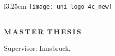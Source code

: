 \frontmatter
\pagestyle{empty}


\begin{titlepage}
\rule{0mm}{1mm}
\vspace*{10mm}
\begin{wrapfigure}{l}{3.25cm}
    \texttt{[image: uni-logo-4c\_new]}
\end{wrapfigure}
\begin{flushright}
    \setlength{\unitlength}{1cm}
    {\large \MOrg \vskip 5mm
    \MInstitution}\\
    \textbf{\large \MGroup}
    \vskip 15mm
    \textbf{\Large M\,A\,S\,T\,E\,R\,\,\,T\,H\,E\,S\,I\,S}
\end{flushright}

\begin{center}
    \vskip 25mm
    {\LARGE\bf \MTitle}
    \vskip 5mm
    \vskip 1cm
    {\large \textbf{\MAuthor}}\vskip 15mm
    \vskip 2cm
    {\large Supervisor: \MSupervisor}
    \vfill
    {\large Innsbruck, \MDate} 
\end{center}
\end{titlepage} 

\ClearShipoutPicture

